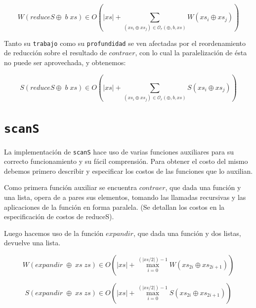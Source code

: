 \documentclass[a4paper,10pt]{article}
\begin{document}
\begin{equation*}
    W \left( reduceS \oplus \; b \; xs \right) \in
    O \left( \vert xs \vert + \sum_{(xs_i \oplus xs_j) \in \mathcal{O}_r(\oplus,b,xs)} W \left( xs_i \oplus xs_j \right) \right)
\end{equation*}

\bigskip

    Tanto su \texttt{trabajo} como su \texttt{profundidad} se ven afectadas por
el reordenamiento de reducción sobre el resultado de $contraer$, con lo cual la paralelización
de ésta no puede ser aprovechada, y obtenemos:

\begin{equation*}
    S \left( reduceS \oplus \; b \; xs \right) \in
    O \left( \vert xs \vert + \sum_{(xs_i \oplus xs_j) \in \mathcal{O}_r(\oplus,b,xs)} S \left( xs_i \oplus xs_j \right) \right)
\end{equation*}


\bigskip


\section*{\texttt{scanS}}

    La implementación de \texttt{scanS} hace uso de varias funciones auxiliares
para su correcto funcionamiento y su fácil comprensión. Para obtener el costo del
mismo debemos primero describir y especificar los costos de las funciones que lo 
auxilian.

    Como primera función auxiliar se encuentra $contraer$, que dada una función y
una lista, opera de a pares sus elementos, tomando las llamadas recursivas y las 
aplicaciones de la función en forma paralela. (Se detallan los costos en la
especificación de costos de reduceS).

\smallskip

    Luego hacemos uso de la función $expandir$, que dada una función y dos listas,
devuelve una lista. 

\begin{equation*}
    W \left( expandir \;\oplus \;xs \;zs \right) \in
    O \left( \vert xs \vert + \max_{i=0}^{(\vert xs / 2 \vert) - 1} W \left( xs_{2i} \oplus xs_{2i+1} \right) \right)
\end{equation*}

\begin{equation*}
    S \left( expandir \;\oplus \;xs \;zs \right) \in
    O \left( \vert xs \vert + \max_{i=0}^{(\vert xs / 2 \vert) - 1} S \left( xs_{2i} \oplus xs_{2i+1} \right) \right)
\end{equation*}
\end{document}
